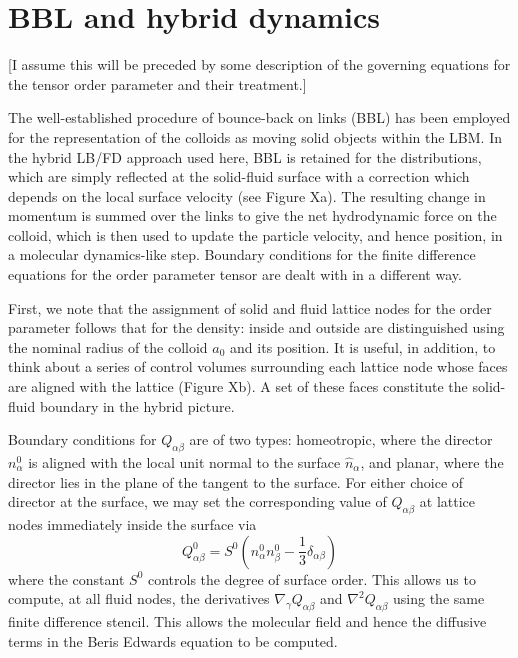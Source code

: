 %
%
%

\section{BBL and hybrid dynamics}

[I assume this will be preceded by some description of the
governing equations for the tensor order parameter and their
treatment.]

The well-established procedure of bounce-back on links (BBL)
\cite{Ladd04, nguyen} has been employed for the representation
of the colloids as moving solid objects within the LBM.
In the hybrid LB/FD approach used here, BBL is retained for
the distributions, which are simply reflected at the solid-fluid
surface with a correction which depends on the local surface
velocity (see Figure Xa). The resulting change in momentum is
summed over the links to give the net hydrodynamic
force on the colloid, which is then used to update the
particle velocity, and
hence position, in a molecular dynamics-like step. Boundary
conditions for the finite difference equations for the order
parameter tensor are dealt with in a different way.

First, we note that the assignment of solid and fluid lattice
nodes for the order parameter follows that for the density:
inside and outside are distinguished using the nominal radius
of the colloid $a_0$ and its position. It is useful, in addition,
to think about a series of control volumes surrounding each lattice
node whose faces are aligned with the lattice (Figure Xb). A set of
these
faces constitute the solid-fluid boundary in the hybrid picture.

Boundary conditions for $Q_{\alpha\beta}$ are of two types:
homeotropic, where the director  $n_\alpha^0$ is aligned with
the local unit normal to the surface $\hat{n}_\alpha$, and planar,
where the director lies in the plane of the tangent to the
surface. For either choice of director at the surface, we
may set the corresponding value of $Q_{\alpha\beta}$ at
lattice nodes immediately inside the surface via
\begin{equation}
Q_{\alpha\beta}^0 = S^0 (n_\alpha^0 n_\beta^0
- {\scriptstyle\frac{1}{3}}\delta_{\alpha\beta})
\end{equation}
where the constant $S^0$ controls the degree of surface order.
This allows us
to compute, at all fluid nodes, the derivatives
$\nabla_\gamma Q_{\alpha\beta}$ and $\nabla^2 Q_{\alpha\beta}$
using the same finite difference stencil. This allows the
molecular field and hence the diffusive terms in the Beris
Edwards equation to be computed.

